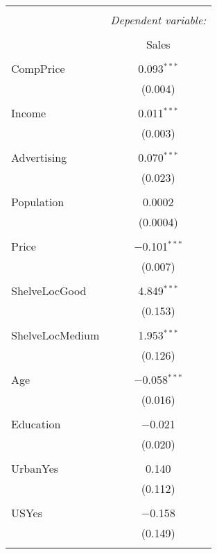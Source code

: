 \documentclass[12pt]{article}
\begin{document}
\begin{table}[!htbp] \centering 
  \caption{} 
  \label{} 
\begin{tabular}{@{\extracolsep{5pt}}lc} 
\\[-1.8ex]\hline 
\hline \\[-1.8ex] 
 & \multicolumn{1}{c}{\textit{Dependent variable:}} \\ 
\cline{2-2} 
\\[-1.8ex] & Sales \\ 
\hline \\[-1.8ex] 
 CompPrice & 0.093$^{***}$ \\ 
  & (0.004) \\ 
  & \\ 
 Income & 0.011$^{***}$ \\ 
  & (0.003) \\ 
  & \\ 
 Advertising & 0.070$^{***}$ \\ 
  & (0.023) \\ 
  & \\ 
 Population & 0.0002 \\ 
  & (0.0004) \\ 
  & \\ 
 Price & $-$0.101$^{***}$ \\ 
  & (0.007) \\ 
  & \\ 
 ShelveLocGood & 4.849$^{***}$ \\ 
  & (0.153) \\ 
  & \\ 
 ShelveLocMedium & 1.953$^{***}$ \\ 
  & (0.126) \\ 
  & \\ 
 Age & $-$0.058$^{***}$ \\ 
  & (0.016) \\ 
  & \\ 
 Education & $-$0.021 \\ 
  & (0.020) \\ 
  & \\ 
 UrbanYes & 0.140 \\ 
  & (0.112) \\ 
  & \\ 
 USYes & $-$0.158 \\ 
  & (0.149) \\ 
  & \\ 

\end{tabular}
\end{table}
\end{document}

